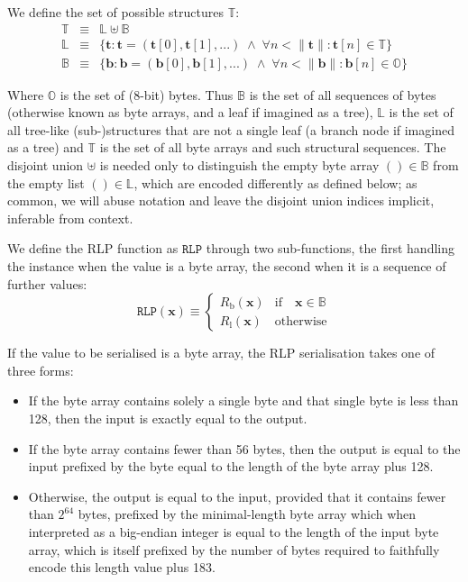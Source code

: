 \documentclass[9pt,oneside]{amsart}
\makeatletter
\newcommand{\linkdest}[1]{\Hy@raisedlink{\hypertarget{#1}{}}}
\makeatother
\begin{document}
We define the set of possible structures $\mathbb{T}$:
\begin{eqnarray}
\mathbb{T} & \equiv & \mathbb{L} \uplus \mathbb{B} \\
\mathbb{L} & \equiv & \{ \mathbf{t}: \mathbf{t} = ( \mathbf{t}[0], \mathbf{t}[1], ... ) \; \wedge \; \forall n < \lVert \mathbf{t} \rVert : \mathbf{t}[n] \in \mathbb{T} \} \\
\mathbb{B} & \equiv & \{ \mathbf{b}: \mathbf{b} = ( \mathbf{b}[0], \mathbf{b}[1], ... ) \; \wedge \; \forall n < \lVert \mathbf{b} \rVert : \mathbf{b}[n] \in \mathbb{O} \}
\end{eqnarray}

Where $\mathbb{O}$ is the set of (8-bit) bytes. Thus $\mathbb{B}$ is the set of all sequences of bytes (otherwise known as byte arrays, and a leaf if imagined as a tree), $\mathbb{L}$ is the set of all tree-like (sub-)structures that are not a single leaf (a branch node if imagined as a tree) and $\mathbb{T}$ is the set of all byte arrays and such structural sequences. The disjoint union $\uplus$ is needed only to distinguish the empty byte array $()\in\mathbb{B}$ from the empty list $()\in\mathbb{L}$, which are encoded differently as defined below; as common, we will abuse notation and leave the disjoint union indices implicit, inferable from context.

We define the RLP function as $\mathtt{RLP}$ through two sub-functions, the first handling the instance when the value is a byte array, the second when it is a sequence of further values:
\begin{equation}
\mathtt{RLP}(\mathbf{x}) \equiv \begin{cases} R_{\mathrm{b}}(\mathbf{x}) & \text{if} \quad \mathbf{x} \in \mathbb{B} \\ R_{\mathrm{l}}(\mathbf{x}) & \text{otherwise} \end{cases}
\end{equation}

\hypertarget{RLP_serialisation_of_a_byte_array_R__b_word_def}{}\linkdest{R__b}If the value to be serialised is a byte array, the RLP serialisation takes one of three forms:

\begin{itemize}
\item If the byte array contains solely a single byte and that single byte is less than 128, then the input is exactly equal to the output.
\item If the byte array contains fewer than 56 bytes, then the output is equal to the input prefixed by the byte equal to the length of the byte array plus 128.
\item Otherwise, the output is equal to the input, provided that it contains fewer than $2^{64}$ bytes, prefixed by the minimal-length byte array which when interpreted as a big-endian integer is equal to the length of the input byte array, which is itself prefixed by the number of bytes required to faithfully encode this length value plus 183.
\end{itemize}
\end{document}
